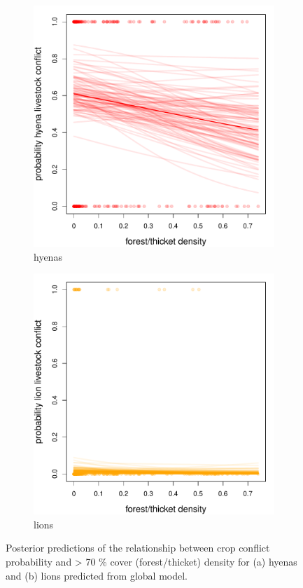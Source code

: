 \documentclass[12pt,]{article}
\begin{document}
\begin{figure}[H]
  \centering
	\begin{subfigure}[b]{0.49\textwidth}
	\includegraphics[width=\textwidth]{Figures/c70_livestock_global_conflict_hyena.pdf} 
    \caption{hyenas}
   	    \label{fig:cropC70hyena}
\end{subfigure}
\begin{subfigure}[b]{0.49\textwidth}
	\includegraphics[width=\textwidth]{Figures/c70_livestock_global_conflict_lion.pdf}  
    \caption{lions}
  	\label{fig:cropC70leo}
\end{subfigure}
\caption{Posterior predictions of the relationship between crop conflict probability and > 70 \% cover (forest/thicket) density for (a) hyenas and (b) lions predicted from global model.}
\end{figure}
\end{document}

